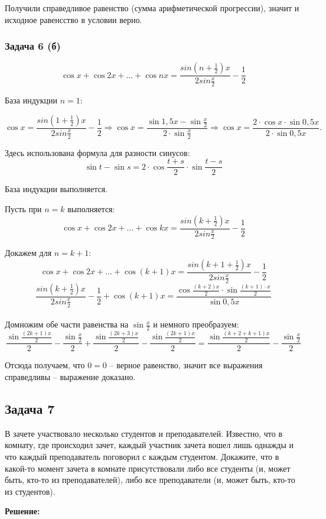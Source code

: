 \documentclass[a4paper,14pt]{article} %
\begin{document}
Получили справедливое равенство (сумма арифметической прогрессии), значит и исходное равенсство в условии верно.

\newpage
\begin{center}
\subsubsection{Задача 6 (б)}
\end{center}
\[ \cos{x} + \cos2x + \dots + \cos{nx} = \frac{sin(n+\frac{1}{2})x}{2sin\frac{x}{2}} - \frac{1}{2}\]

База индукции $n = 1$:

\[ \cos{x} = \frac{sin(1+\frac{1}{2})x}{2sin\frac{x}{2}} - \frac{1}{2} \Rightarrow \cos{x} = \frac{\sin{1,5x} - \sin{\frac{x}{2}}}{2\cdot \sin{\frac{x}{2}}} \Rightarrow \cos{x} = \frac{2\cdot \cos{x}\cdot \sin{0,5x}}{2\cdot \sin{0,5x}}.\]

Здесь использована формула для разности синусов:
\[ \sin{t} - \sin{s} = 2\cdot \cos{\frac{t+s}{2}}\cdot \sin{\frac{t - s}{2}} \]

База индукции выполняется.

Пусть при $n = k$ выполняется:
\[ \cos{x} + \cos2x + \dots + \cos{kx} = \frac{sin(k+\frac{1}{2})x}{2sin\frac{x}{2}} - \frac{1}{2}\]

Докажем для $n = k + 1:$
\[ \cos{x} + \cos2x + \dots + \cos{(k+1)x} = \frac{sin(k+1+\frac{1}{2})x}{2sin\frac{x}{2}} - \frac{1}{2}\]
\[ \frac{sin(k+\frac{1}{2})x}{2sin\frac{x}{2}} - \frac{1}{2} + \cos{(k+1)x} = \frac{\cos{\frac{(k+2)x}{2}}\cdot \sin{\frac{(k+1)\cdot x}{2}}}{\sin{0,5x}}\]\\

Домножим обе части равенства на $\sin{\frac{x}{2}}$ и немного преобразуем:
\[ \frac{\sin{\frac{(2k+1)x}{2}}}{2} - \frac{\sin{\frac{x}{2}}}{2} + \frac{\sin{\frac{(2k+3)x}{2}}}{2} - \frac{\sin{\frac{(2k+1)x}{2}}}{2} = \frac{\sin{\frac{(k+2+k+1)x}{2}}}{2} - \frac{\sin{\frac{x}{2}}}{2}\]

Отсюда получаем, что $ 0 = 0$ -- верное равенство, значит все выражения справедливы -- выражение доказано.
\newpage
\begin{center}
\subsection{Задача 7}
\end{center}

 В зачете участвовало несколько студентов и преподавателей. Известно, что в комнату, где происходил зачет, каждый участник зачета
вошел лишь однажды и что каждый преподаватель поговорил с каждым студентом. Докажите, что в какой-то момент зачета в комнате
присутствовали либо все студенты (и, может быть, кто-то из преподавателей), либо все преподаватели (и, может быть, кто-то из студентов).
\begin{center}
\bfseries
{\Large Решение: }
\end{center}
\end{document}

